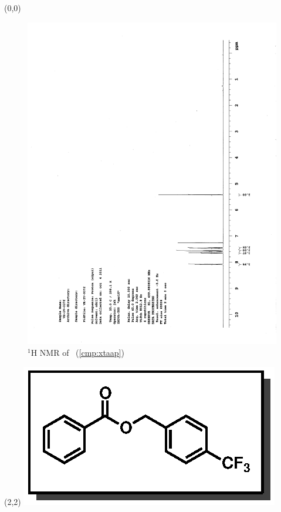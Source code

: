 \begin{textblock}{20}(0,0)
\begin{figure}[htb]
\caption{$^1$H NMR of \CMPxtaap\ (\ref{cmp:xtaap})}
\includegraphics[scale=0.75, trim = 0mm 0mm 0mm 5mm,
clip]{chp_asymmetric/images/nmr/xtaapH}
\vspace{-100pt}
\end{figure}
\end{textblock}
\begin{textblock}{1}(2,2)
\includegraphics[scale=0.8, angle=90]{chp_asymmetric/images/xtaap}
\end{textblock}
